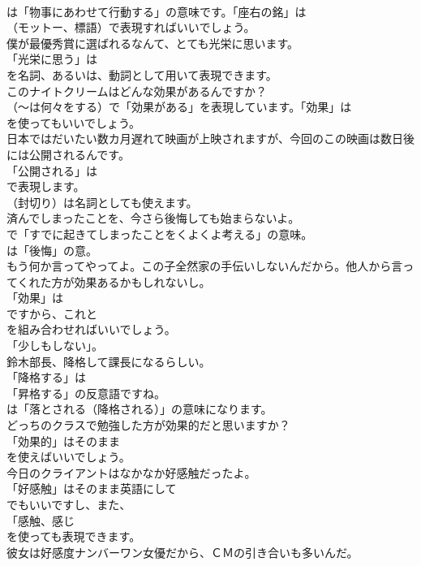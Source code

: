 \documentclass[8pt]{extreport}
\begin{document}
\begin{CJK}{UTF8}{min}
\\	は「物事にあわせて行動する」の意味です。「座右の銘」は
\\	（モットー、標語）で表現すればいいでしょう。	
\\	僕が最優秀賞に選ばれるなんて、とても光栄に思います。 
\\	「光栄に思う」は
\\	を名詞、あるいは、動詞として用いて表現できます。	
\\	このナイトクリームはどんな効果があるんですか？ 
\\	（～は何々をする）で「効果がある」を表現しています。「効果」は 
\\	を使ってもいいでしょう。	
\\	日本ではだいたい数カ月遅れて映画が上映されますが、今回のこの映画は数日後には公開されるんです。 
\\	「公開される」は 
\\	で表現します。
\\	（封切り）は名詞としても使えます。	
\\	済んでしまったことを、今さら後悔しても始まらないよ。 
\\	で「すでに起きてしまったことをくよくよ考える」の意味。
\\	は「後悔」の意。	
\\	もう何か言ってやってよ。この子全然家の手伝いしないんだから。他人から言ってくれた方が効果あるかもしれないし。 
\\	「効果」は
\\	ですから、これと
\\	を組み合わせればいいでしょう。
\\	「少しもしない」。	
\\	鈴木部長、降格して課長になるらしい。 
\\	「降格する」は
\\	「昇格する」の反意語ですね。
\\	は「落とされる（降格される）」の意味になります。	
\\	どっちのクラスで勉強した方が効果的だと思いますか？ 
\\	「効果的」はそのまま
\\	を使えばいいでしょう。	
\\	今日のクライアントはなかなか好感触だったよ。 
\\	「好感触」はそのまま英語にして
\\	でもいいですし、また、
\\	「感触、感じ
\\	を使っても表現できます。	
\\	彼女は好感度ナンバーワン女優だから、ＣＭの引き合いも多いんだ。 

\end{CJK}
\end{document}
